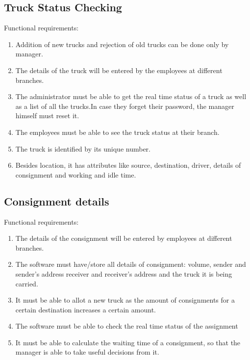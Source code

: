 \documentclass[english,openany,12pt,a4paper,dvipsnames]{book}
\begin{document}
        \subsection{Truck Status Checking}
        Functional requirements:
            \begin{enumerate}
              \item Addition of new trucks and rejection of old trucks can be done only by manager.
              \item The details of the truck will be entered by the employees at different branches.
              \item The administrator must be able to get the real time status of a truck as well as a list of all the
                    trucks.In case they forget their password, the manager himself must reset it.
              \item The employees must be able to see the truck status at their branch.
               \item The truck is identified by its unique number.
               \item Besides location, it has attributes like source, destination, driver, details of consignment and
                    working and idle time.
            \end{enumerate}
    
        \subsection{Consignment details}
        Functional requirements:
            \begin{enumerate}
              \item The details of the consignment will be entered by employees at different branches.
              \item The software must have/store all details of consignment: volume, sender and sender’s
                    address receiver and receiver’s address and the truck it is being carried.
              \item It must be able to allot a new truck as the amount of consignments for a certain destination
                    increases a certain amount.
              \item The software must be able to check the real time status of the assignment
               \item It must be able to calculate the waiting time of a consignment, so that the manager is able to
                        take useful decisions from it.
            \end{enumerate}
    
\end{document}
